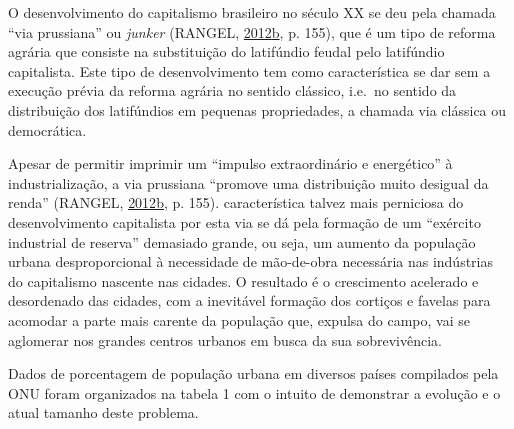 \documentclass[a4paper, 12pt]{article}
\begin{document}
O desenvolvimento do capitalismo brasileiro no século XX se deu pela
chamada ``via prussiana'' ou \emph{junker} (RANGEL,
\protect\hyperlink{ref-rangel1988}{2012}\protect\hyperlink{ref-rangel1988}{b},
p. 155), que é um tipo de reforma agrária que consiste na substituição
do latifúndio feudal pelo latifúndio capitalista. Este tipo de
desenvolvimento tem como característica se dar sem a execução prévia da
reforma agrária no sentido clássico, i.e.~no sentido da distribuição dos
latifúndios em pequenas propriedades, a chamada via clássica ou
democrática.

Apesar de permitir imprimir um ``impulso extraordinário e energético'' à
industrialização, a via prussiana ``promove uma distribuição muito
desigual da renda'' (RANGEL,
\protect\hyperlink{ref-rangel1988}{2012}\protect\hyperlink{ref-rangel1988}{b},
p. 155). característica talvez mais perniciosa do desenvolvimento
capitalista por esta via se dá pela formação de um ``exército industrial
de reserva'' demasiado grande, ou seja, um aumento da população urbana
desproporcional à necessidade de mão-de-obra necessária nas indústrias
do capitalismo nascente nas cidades. O resultado é o crescimento
acelerado e desordenado das cidades, com a inevitável formação dos
cortiços e favelas para acomodar a parte mais carente da população que,
expulsa do campo, vai se aglomerar nos grandes centros urbanos em busca
da sua sobrevivência.

Dados de porcentagem de população urbana em diversos países compilados
pela ONU foram organizados na tabela 1 com o intuito de demonstrar a
evolução e o atual tamanho deste problema.
\end{document}
